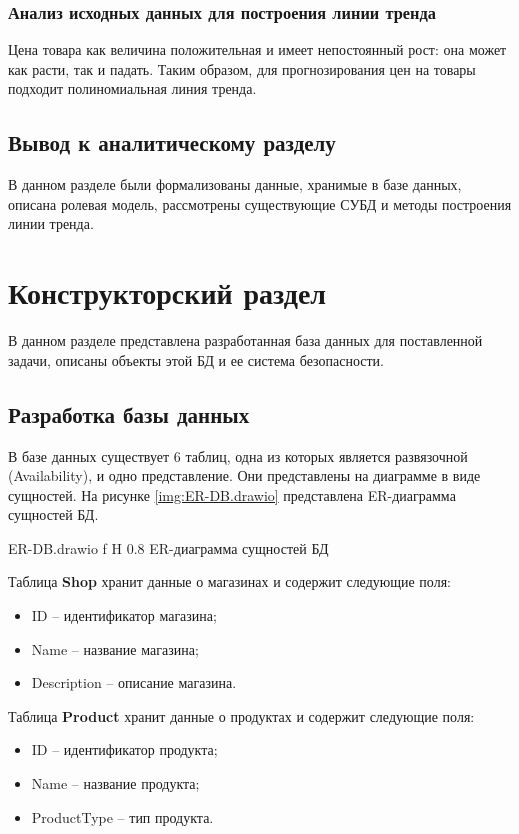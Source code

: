 \documentclass{bmstu}
\begin{document}
\subsection{Анализ исходных данных для построения линии тренда}

Цена товара как величина положительная и имеет непостоянный рост: она может как расти, так и падать. Таким образом, для прогнозирования цен на товары подходит полиномиальная линия тренда.

\section*{Вывод к аналитическому разделу}

В данном разделе были формализованы данные, хранимые в базе данных, описана ролевая модель, рассмотрены существующие СУБД и методы построения линии тренда.

\chapter{Конструкторский раздел}

В данном разделе представлена разработанная база данных для поставленной задачи, описаны объекты этой БД и ее система безопасности.

\section{Разработка базы данных}

В базе данных существует 6 таблиц, одна из которых является развязочной (Availability), и одно представление. Они представлены на диаграмме в виде сущностей. На рисунке \ref{img:ER-DB.drawio} представлена ER-диаграмма сущностей БД.

	{ER-DB.drawio}
	{f}
	{H}
	{0.8\textwidth}
	{ER-диаграмма сущностей БД}

Таблица \textbf{Shop} хранит данные о магазинах и содержит следующие поля:
\begin{itemize}
	\item ID -- идентификатор магазина;
	\item Name -- название магазина;
	\item Description -- описание магазина.
\end{itemize}


Таблица \textbf{Product} хранит данные о продуктах и содержит следующие поля:
\begin{itemize}
	\setlength\itemsep{0.01em}
	\item ID -- идентификатор продукта;
	\item Name -- название продукта;
	\item ProductType -- тип продукта.
\end{itemize}
\end{document}
